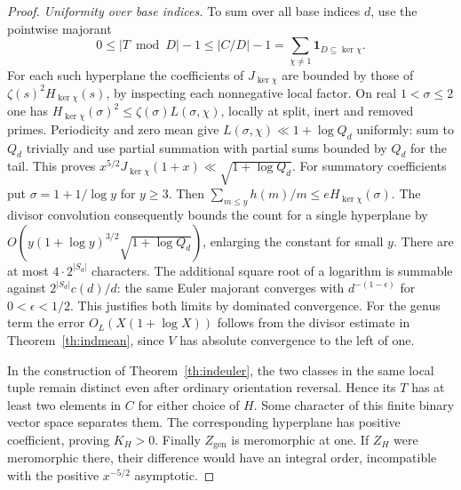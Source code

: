 \begin{proof}
\emph{Uniformity over base indices.}
To sum over all base indices $d$, use the pointwise majorant
\[
 0\le |T\bmod D|-1\le |C/D|-1
 =\sum_{\chi\ne1}\mathbf1_{D\subseteq\ker\chi}.
\]
For each such hyperplane the coefficients of $J_{\ker\chi}$ are bounded by those of $\zeta(s)^2H_{\ker\chi}(s)$, by inspecting each nonnegative local factor. On real $1<\sigma\le2$ one has $H_{\ker\chi}(\sigma)^2\le\zeta(\sigma)L(\sigma,\chi)$, locally at split, inert and removed primes. Periodicity and zero mean give $L(\sigma,\chi)\ll1+\log Q_d$ uniformly: sum to $Q_d$ trivially and use partial summation with partial sums bounded by $Q_d$ for the tail. This proves $x^{5/2}J_{\ker\chi}(1+x)\ll\sqrt{1+\log Q_d}$. For summatory coefficients put $\sigma=1+1/\log y$ for $y\ge3$. Then $\sum_{m\le y}h(m)/m\le eH_{\ker\chi}(\sigma)$. The divisor convolution consequently bounds the count for a single hyperplane by $O(y(1+\log y)^{3/2}\sqrt{1+\log Q_d})$, enlarging the constant for small $y$. 
There are at most $4\cdot2^{|S_d|}$ characters. The additional square root of a logarithm is summable against $2^{|S_d|}c(d)/d$: the same Euler majorant converges with $d^{-(1-\epsilon)}$ for $0<\epsilon<1/2$. This justifies both limits by dominated convergence. For the genus term the error $O_L(X(1+\log X))$ follows from the divisor estimate in Theorem~\ref{th:indmean}, since $V$ has absolute convergence to the left of one.

In the construction of Theorem~\ref{th:indeuler}, the two classes in the same local tuple remain distinct even after ordinary orientation reversal. Hence its $T$ has at least two elements in $C$ for either choice of $H$. Some character of this finite binary vector space separates them. The corresponding hyperplane has positive coefficient, proving $K_H>0$. Finally $Z_{\mathrm{gen}}$ is meromorphic at one. If $Z_H$ were meromorphic there, their difference would have an integral order, incompatible with the positive $x^{-5/2}$ asymptotic.
\end{proof}

